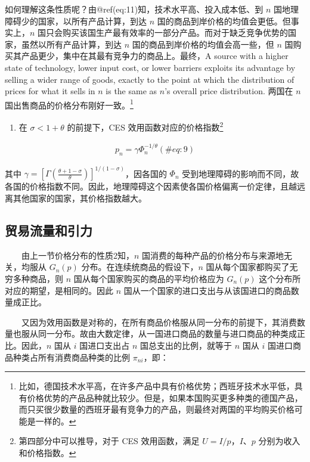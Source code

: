 \documentclass[]{tufte-handout}
\providecommand{\tightlist}{%
  \setlength{\itemsep}{0pt}\setlength{\parskip}{0pt}}
\begin{document}
如何理解这条性质呢？由@ref(eq:11)知，技术水平高、投入成本低、到 \(n\)
国地理障碍少的国家，以所有产品计算，到达 \(n\)
国的商品到岸价格的均值会更低。但事实上，\(n\)
国只会购买该国生产最有效率的一部分产品。而对于缺乏竞争优势的国家，虽然以所有产品计算，到达
\(n\) 国的商品到岸价格的均值会高一些，但 \(n\)
国购买其产品更少，集中在其最有竞争力的商品上。最终，A source with a
higher state of technology, lower input cost, or lower barriers exploits
its advantage by selling a wider range of goods, exactly to the point at
which the distribution of prices for what it sells in \(n\) is the same
as \(n\)'s overall price distribution. 两国在 \(n\)
国出售商品的价格分布刚好一致。\footnote{比如，德国技术水平高，在许多产品中具有价格优势；西班牙技术水平低，具有价格优势的产品品种就比较少。但是，如果本国购买更多种类的德国产品，而只买很少数量的西班牙最有竞争力的产品，则最终对两国的平均购买价格可能是一样的。}

\begin{enumerate}
\def\labelenumi{\arabic{enumi}.}
\setcounter{enumi}{2}
\tightlist
\item
  在 \(\sigma < 1 + \theta\) 的前提下，CES
  效用函数对应的价格指数\footnote{第四部分中可以推导，对于 CES
    效用函数，满足 \(U=I/p\)，\(I、p\) 分别为收入和价格指数。}
\end{enumerate}

\begin{align}
p_{n}=\gamma \Phi_{n}^{-1 / \theta}  (\#eq:9)
\end{align}

其中
\(\gamma=\left[\Gamma\left(\frac{\theta+1-\sigma}{\theta}\right)\right]^{1 /(1-\sigma)}\)，因各国的
\(\Phi_{n}\)
受到地理障碍的影响而不同，故各国的价格指数不同。因此，地理障碍这个因素使各国价格偏离一价定律，且越远离其他国家的国家，其价格指数越大。

\hypertarget{ux8d38ux6613ux6d41ux91cfux548cux5f15ux529b}{%
\subsection{贸易流量和引力}\label{ux8d38ux6613ux6d41ux91cfux548cux5f15ux529b}}

　　由上一节价格分布的性质2知，\(n\)
国消费的每种产品的价格分布与来源地无关，均服从 \(G_n(p)\)
分布。在连续统商品的假设下，\(n\) 国从每个国家都购买了无穷多种商品，则
\(n\) 国从每个国家购买的商品的平均价格应为 \(G_n(p)\)
这个分布所对应的期望，是相同的。因此 \(n\)
国从一个国家的进口支出与从该国进口的商品数量成正比。

　　又因为效用函数是对称的，在所有商品价格服从同一分布的前提下，其消费数量也服从同一分布。故由大数定律，从一国进口商品的数量与进口商品的种类成正比。因此，\(n\)
国从 \(i\) 国进口支出占 \(n\) 国总支出的比例，就等于 \(n\) 国从 \(i\)
国进口商品种类占所有消费商品种类的比例 \(\pi_{ni}\)，即：
\end{document}
